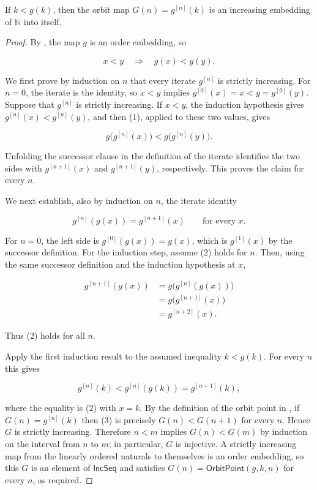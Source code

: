 \begin{lemma}
If $k<g(k)$, then the orbit map
$G(n)=g^{[n]}(k)$ is an increasing embedding of $\mathbb N$ into itself.
\end{lemma}
\begin{proof}
By , the map $g$ is an order embedding, so

\[
x<y \quad\Longrightarrow\quad g(x)<g(y).
\tag{1}
\]

We first prove by induction on $n$ that every iterate $g^{[n]}$ is strictly
increasing.  For $n=0$, the iterate is the identity, so $x<y$ implies
$g^{[0]}(x)=x<y=g^{[0]}(y)$.  Suppose that $g^{[n]}$ is strictly
increasing.  If $x<y$, the induction hypothesis gives
$g^{[n]}(x)<g^{[n]}(y)$, and then (1), applied to these two values, gives

\[
g\bigl(g^{[n]}(x)\bigr)<g\bigl(g^{[n]}(y)\bigr).
\]

Unfolding the successor clause in the definition of the iterate identifies
the two sides with $g^{[n+1]}(x)$ and $g^{[n+1]}(y)$, respectively.  This
proves the claim for every $n$.

We next establish, also by induction on $n$, the iterate identity

\[
g^{[n]}(g(x))=g^{[n+1]}(x) \qquad\text{for every }x.
\tag{2}
\]

For $n=0$, the left side is $g^{[0]}(g(x))=g(x)$, which is
$g^{[1]}(x)$ by the successor definition.  For the induction step, assume
(2) holds for $n$.  Then, using the same successor definition and the
induction hypothesis at $x$,

\[
\begin{aligned}
g^{[n+1]}(g(x))
  &=g\bigl(g^{[n]}(g(x))\bigr)\\
  &=g\bigl(g^{[n+1]}(x)\bigr)\\
  &=g^{[n+2]}(x).
\end{aligned}
\]

Thus (2) holds for all $n$.

Apply the first induction result to the assumed inequality $k<g(k)$.
For every $n$ this gives

\[
g^{[n]}(k)<g^{[n]}(g(k))=g^{[n+1]}(k),
\tag{3}
\]

where the equality is (2) with $x=k$.  By the definition of the orbit point
in , if $G(n)=g^{[n]}(k)$ then (3) is precisely
$G(n)<G(n+1)$ for every $n$.  Hence $G$ is strictly increasing.  Therefore
$n<m$ implies $G(n)<G(m)$ by induction on the interval from $n$ to $m$;
in particular, $G$ is injective.  A strictly increasing map from the
linearly ordered naturals to themselves is an order embedding, so this $G$
is an element of $\mathsf{IncSeq}$ and satisfies
$G(n)=\mathsf{OrbitPoint}(g,k,n)$ for every $n$, as required.
\end{proof}
